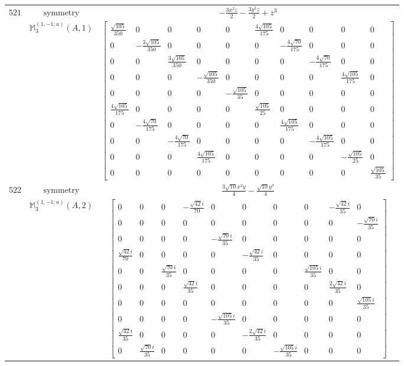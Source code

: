 \documentclass[fleqn,8pt,landscape]{jsarticle}
\begin{document}
\begin{longtable}{ccc}
$ 521 $ & $ \text{symmetry} $ & $ - \frac{3 x^{2} z}{2} - \frac{3 y^{2} z}{2} + z^{3} $ \\
$  $ & $ \mathbb{M}_{3}^{(1,-1;a)}(A,1) $ & $ \begin{bmatrix} \frac{\sqrt{105}}{350} & 0 & 0 & 0 & 0 & \frac{4 \sqrt{105}}{175} & 0 & 0 & 0 & 0 \\ 0 & - \frac{3 \sqrt{105}}{350} & 0 & 0 & 0 & 0 & - \frac{4 \sqrt{70}}{175} & 0 & 0 & 0 \\ 0 & 0 & \frac{3 \sqrt{105}}{350} & 0 & 0 & 0 & 0 & - \frac{4 \sqrt{70}}{175} & 0 & 0 \\ 0 & 0 & 0 & - \frac{\sqrt{105}}{350} & 0 & 0 & 0 & 0 & \frac{4 \sqrt{105}}{175} & 0 \\ 0 & 0 & 0 & 0 & - \frac{\sqrt{105}}{35} & 0 & 0 & 0 & 0 & 0 \\ \frac{4 \sqrt{105}}{175} & 0 & 0 & 0 & 0 & \frac{\sqrt{105}}{25} & 0 & 0 & 0 & 0 \\ 0 & - \frac{4 \sqrt{70}}{175} & 0 & 0 & 0 & 0 & \frac{4 \sqrt{105}}{175} & 0 & 0 & 0 \\ 0 & 0 & - \frac{4 \sqrt{70}}{175} & 0 & 0 & 0 & 0 & - \frac{4 \sqrt{105}}{175} & 0 & 0 \\ 0 & 0 & 0 & \frac{4 \sqrt{105}}{175} & 0 & 0 & 0 & 0 & - \frac{\sqrt{105}}{25} & 0 \\ 0 & 0 & 0 & 0 & 0 & 0 & 0 & 0 & 0 & \frac{\sqrt{105}}{35} \end{bmatrix} $ \\ \hline
$ 522 $ & $ \text{symmetry} $ & $ \frac{3 \sqrt{10} x^{2} y}{4} - \frac{\sqrt{10} y^{3}}{4} $ \\
$  $ & $ \mathbb{M}_{3}^{(1,-1;a)}(A,2) $ & $ \begin{bmatrix} 0 & 0 & 0 & - \frac{\sqrt{42} i}{70} & 0 & 0 & 0 & 0 & - \frac{\sqrt{42} i}{35} & 0 \\ 0 & 0 & 0 & 0 & 0 & 0 & 0 & 0 & 0 & - \frac{\sqrt{70} i}{35} \\ 0 & 0 & 0 & 0 & - \frac{\sqrt{70} i}{35} & 0 & 0 & 0 & 0 & 0 \\ \frac{\sqrt{42} i}{70} & 0 & 0 & 0 & 0 & - \frac{\sqrt{42} i}{35} & 0 & 0 & 0 & 0 \\ 0 & 0 & \frac{\sqrt{70} i}{35} & 0 & 0 & 0 & 0 & \frac{\sqrt{105} i}{35} & 0 & 0 \\ 0 & 0 & 0 & \frac{\sqrt{42} i}{35} & 0 & 0 & 0 & 0 & \frac{2 \sqrt{42} i}{35} & 0 \\ 0 & 0 & 0 & 0 & 0 & 0 & 0 & 0 & 0 & \frac{\sqrt{105} i}{35} \\ 0 & 0 & 0 & 0 & - \frac{\sqrt{105} i}{35} & 0 & 0 & 0 & 0 & 0 \\ \frac{\sqrt{42} i}{35} & 0 & 0 & 0 & 0 & - \frac{2 \sqrt{42} i}{35} & 0 & 0 & 0 & 0 \\ 0 & \frac{\sqrt{70} i}{35} & 0 & 0 & 0 & 0 & - \frac{\sqrt{105} i}{35} & 0 & 0 & 0 \end{bmatrix} $ \\ \hline

\end{longtable}
\end{document}
